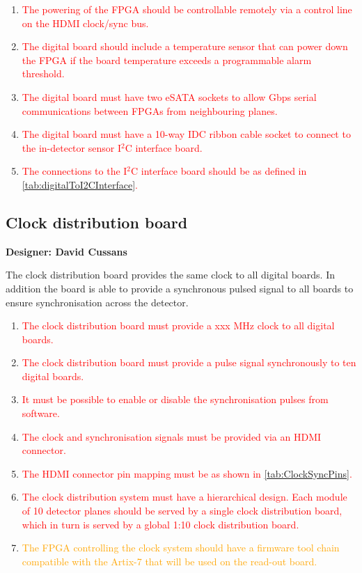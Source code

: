 \documentclass[a4paper]{article}
\newcommand{\must}[1]{\textcolor{red}{#1}}
\newcommand{\should}[1]{\textcolor{orange}{#1}}
\def\I2C{I$^2$C}
\begin{document}
\begin{enumerate}
    \item \must{The powering of the FPGA should be controllable remotely via a control line on the HDMI clock/sync bus.}
    \item \must{The digital board should include a temperature sensor that can power down the FPGA if the board temperature exceeds a programmable alarm threshold.}
    \item \must{The digital board must have two eSATA sockets to allow Gbps serial communications between FPGAs from neighbouring planes.}
    \item \must{The digital board must have a 10-way IDC ribbon cable socket to connect to the in-detector sensor \I2C interface board.}
    \item \must{The connections to the \I2C interface board should be as defined in \cref{tab:digitalToI2CInterface}.}
\end{enumerate}

\clearpage
\newpage
\subsection{Clock distribution board}

{\bf Designer: David Cussans}

The clock distribution board provides the same clock to all digital boards.
In addition the board is able to provide a synchronous pulsed signal to all boards to ensure synchronisation across the detector.

\begin{enumerate}
    \item \must{The clock distribution board must provide a xxx MHz clock to all digital boards.}
    \item \must{The clock distribution board must provide a pulse signal synchronously to ten digital boards.}
    \item \must{It must be possible to enable or disable the synchronisation pulses from software.}
    \item \must{The clock and synchronisation signals must be provided via an HDMI connector.}
    \item \must{The HDMI connector pin mapping must be as shown in \cref{tab:ClockSyncPins}.}
    \item \must{The clock distribution system must have a hierarchical design. Each module of 10 detector planes should be served by a single clock distribution board, which in turn is served by a global 1:10 clock distribution board.}
    \item \should{The FPGA controlling the clock system should have a firmware tool chain compatible with the Artix-7 that will be used on the read-out board.}
\end{enumerate}
\end{document}
